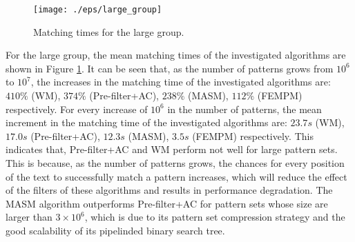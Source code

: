 \documentclass{article}
\begin{document}
\begin{figure}[htbp]
  \centering
  \texttt{[image: ./eps/large\_group]}
  \caption{Matching times for the large group.}
  \label{fig:large_group}
\end{figure}

For the large group, the mean matching times of the investigated
algorithms are shown in Figure \ref{fig:large_group}. It can be seen
that, as the number of patterns grows from $10^6$ to $10^7$, the
increases in the matching time of the investigated algorithms are:
$410\%$ (\textsf{WM}), $374\%$ (\textsf{Pre-filter+AC}), $238\%$
(\textsf{MASM}), $112\%$ (\textsf{FEMPM}) respectively. For every
increase of $10^6$ in the number of patterns, the mean increment in
the matching time of the investigated algorithms are: $23.7s$
(\textsf{WM}), $17.0s$ (\textsf{Pre-filter+AC}), $12.3s$
(\textsf{MASM}), $3.5s$ (\textsf{FEMPM}) respectively. This indicates
that, \textsf{Pre-filter+AC} and \textsf{WM} perform not well for
large pattern sets. This is because, as the number of patterns grows,
the chances for every position of the text to successfully match a
pattern increases, which will reduce the effect of the filters of
these algorithms and results in performance degradation. The
\textsf{MASM} algorithm outperforms \textsf{Pre-filter+AC} for pattern
sets whose size are larger than $3 \times 10^6$, which is due to its
pattern set compression strategy and the good scalability of its
pipelinded binary search tree.
\end{document}
